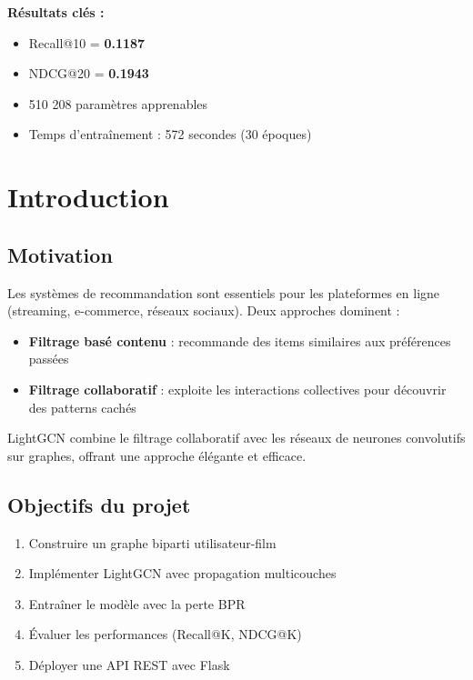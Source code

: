 \documentclass[12pt,a4paper]{report}
\begin{document}
\begin{center}
\begin{tcolorbox}[colback=yellow!10,colframe=Navy,arc=3pt,boxrule=1pt]
\textbf{Résultats clés :}
\begin{itemize}
  \item Recall@10 = \textbf{0.1187}
  \item NDCG@20 = \textbf{0.1943}
  \item 510 208 paramètres apprenables
  \item Temps d'entraînement : 572 secondes (30 époques)
\end{itemize}
\end{tcolorbox}
\end{center}

\tableofcontents

\chapter{Introduction}

\section{Motivation}

Les systèmes de recommandation sont essentiels pour les plateformes en ligne
(streaming, e-commerce, réseaux sociaux). Deux approches dominent :

\begin{itemize}
  \item \textbf{Filtrage basé contenu} : recommande des items similaires aux
        préférences passées
  \item \textbf{Filtrage collaboratif} : exploite les interactions collectives
        pour découvrir des patterns cachés
\end{itemize}

LightGCN combine le filtrage collaboratif avec les réseaux de neurones
convolutifs sur graphes, offrant une approche élégante et efficace.

\section{Objectifs du projet}

\begin{enumerate}
  \item Construire un graphe biparti utilisateur-film
  \item Implémenter LightGCN avec propagation multicouches
  \item Entraîner le modèle avec la perte BPR
  \item Évaluer les performances (Recall@K, NDCG@K)
  \item Déployer une API REST avec Flask
\end{enumerate}
\end{document}
